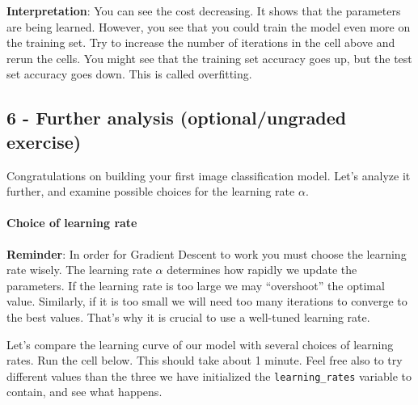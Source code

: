 \documentclass[11pt]{article}
\begin{document}
    \textbf{Interpretation}: You can see the cost decreasing. It shows that
the parameters are being learned. However, you see that you could train
the model even more on the training set. Try to increase the number of
iterations in the cell above and rerun the cells. You might see that the
training set accuracy goes up, but the test set accuracy goes down. This
is called overfitting.

    \subsection{6 - Further analysis (optional/ungraded
exercise)}\label{further-analysis-optionalungraded-exercise}

Congratulations on building your first image classification model. Let's
analyze it further, and examine possible choices for the learning rate
$\alpha$.

    \paragraph{Choice of learning rate}\label{choice-of-learning-rate}

\textbf{Reminder}: In order for Gradient Descent to work you must choose
the learning rate wisely. The learning rate $\alpha$ determines how
rapidly we update the parameters. If the learning rate is too large we
may ``overshoot'' the optimal value. Similarly, if it is too small we
will need too many iterations to converge to the best values. That's why
it is crucial to use a well-tuned learning rate.

Let's compare the learning curve of our model with several choices of
learning rates. Run the cell below. This should take about 1 minute.
Feel free also to try different values than the three we have
initialized the \texttt{learning\_rates} variable to contain, and see
what happens.
\end{document}
